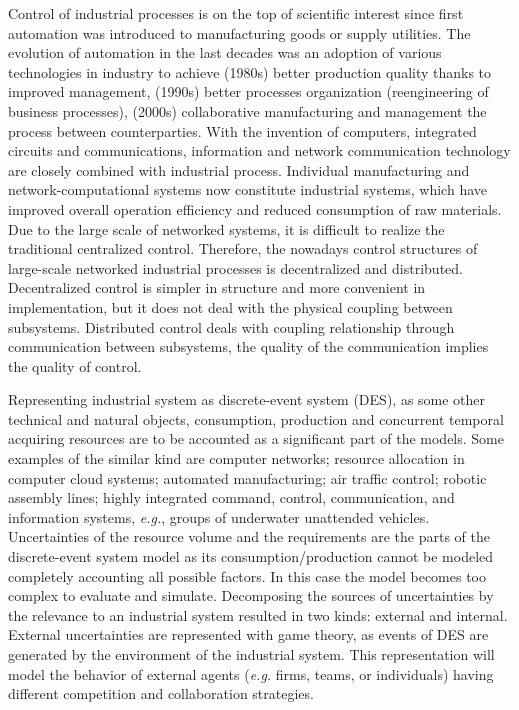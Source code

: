 \documentclass[conference,a4paper]{IEEEtran}
\begin{document}
Control of industrial processes is on the top of scientific interest since first automation was introduced to manufacturing goods or supply utilities. The evolution of automation in the last decades was an adoption of various technologies in industry to achieve (1980s) better production quality thanks to improved management, (1990s) better processes organization (reengineering of business processes), (2000s) collaborative manufacturing and management the process between counterparties. With the invention of computers, integrated circuits and communications, information and network communication technology are closely combined with industrial process. Individual manufacturing and network-computational systems now constitute industrial systems, which have improved overall operation efficiency and reduced consumption of raw materials. Due to the large scale of networked systems, it is difficult to realize the traditional centralized control. Therefore, the nowadays control structures of large-scale networked industrial processes is decentralized and distributed. Decentralized control is simpler in structure and more convenient in implementation, but it does not deal with the physical coupling between subsystems. Distributed control deals with coupling relationship through communication between subsystems, the quality of the communication implies the quality of control.


Representing industrial system as discrete-event system (DES), as some other technical and natural objects, consumption, production and concurrent temporal acquiring resources are to be accounted as a significant part of the models.  Some examples of the similar kind are computer networks; resource allocation in computer cloud systems; automated manufacturing; air traffic control; robotic assembly lines; highly integrated command, control, communication, and information systems, \emph{e.g.}, groups of underwater unattended vehicles.  Uncertainties of the resource volume and the requirements are the parts of the discrete-event system model as its consumption/production cannot be modeled completely accounting all possible factors. In this case the model becomes too complex to evaluate and simulate. Decomposing the sources of uncertainties by the relevance to an industrial system resulted in two kinds: external and internal.  External uncertainties are represented with game theory, as events of DES are generated by the environment of the industrial system.  This representation will model the behavior of external agents (\emph{e.g.} firms, teams, or individuals) having different competition and collaboration strategies.
\end{document}
